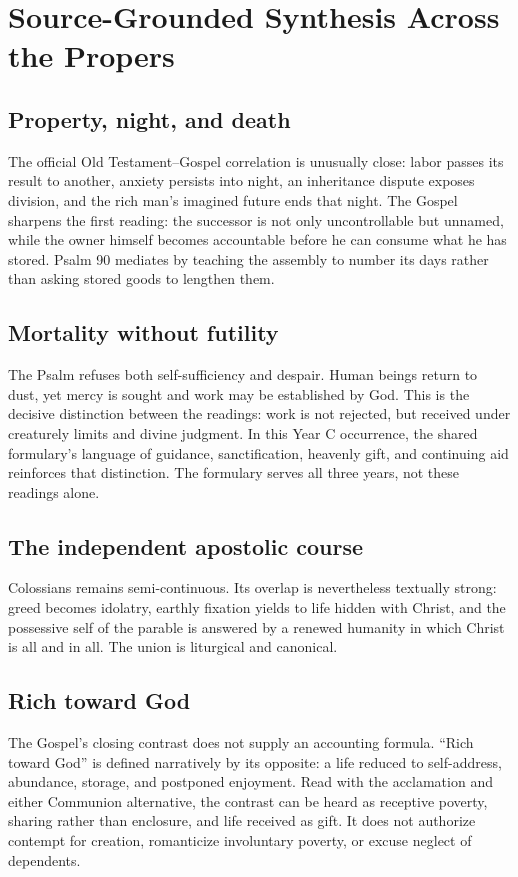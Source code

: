 \section*{Source-Grounded Synthesis Across the Propers}
\subsection*{Property, night, and death}
The official Old Testament--Gospel correlation is unusually close: labor
passes its result to another, anxiety persists into night, an inheritance
dispute exposes division, and the rich man's imagined future ends that night.
The Gospel sharpens the first reading: the successor is not only uncontrollable
but unnamed, while the owner himself becomes accountable before he can consume
what he has stored. Psalm 90 mediates by teaching the assembly to number its
days rather than asking stored goods to lengthen them.
\subsection*{Mortality without futility}
The Psalm refuses both self-sufficiency and despair. Human beings return to
dust, yet mercy is sought and work may be established by God. This is the
decisive distinction between the readings: work is not rejected, but received
under creaturely limits and divine judgment. In this Year C occurrence, the
shared formulary's language of guidance, sanctification, heavenly gift, and
continuing aid reinforces that distinction. The formulary serves
all three years, not these readings alone.
\subsection*{The independent apostolic course}
Colossians remains semi-continuous. Its overlap is nevertheless textually
strong: greed becomes idolatry, earthly fixation yields to life hidden with
Christ, and the possessive self of the parable is answered by a renewed
humanity in which Christ is all and in all. The union is liturgical and
canonical.
\subsection*{Rich toward God}
The Gospel's closing contrast does not supply an accounting formula. ``Rich
toward God'' is defined narratively by its opposite: a life reduced to
self-address, abundance, storage, and postponed enjoyment. Read with the
acclamation and either Communion alternative, the contrast can be heard as
receptive poverty, sharing rather than enclosure, and life received as gift.
It does not authorize contempt for creation, romanticize involuntary poverty,
or excuse neglect of dependents.
